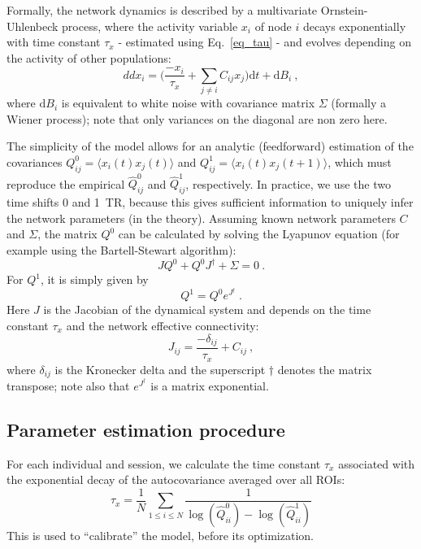\documentclass{article}
\newcommand{\dd}{\mathrm{d}}
\newcommand{\transp}{\dag}
\begin{document}
Formally, the network dynamics is described by a multivariate Ornstein-Uhlenbeck process, where the activity variable $x_i$ of node $i$ decays exponentially with time constant $\tau_x$ - estimated using Eq.~\eqref{eq_tau} - and evolves depending on the activity of other populations:
\begin{equation} \label{eq_dyn_sys}
dd x_i = \big( \frac{- x_i}{\tau_x} + \sum_{j \neq i} C_{ij} x_j \big) \dd t + \dd B_i
\ ,
\end{equation}
where $\dd B_i$ is equivalent to white noise with covariance matrix $\Sigma$ (formally a Wiener process); note that only variances on the diagonal are non zero here.

The simplicity of the model allows for an analytic (feedforward) estimation of the covariances $Q^0_{ij} = \langle x_i(t) x_j(t) \rangle$ and $Q^1_{ij} = \langle x_i(t) x_j(t+1) \rangle$, which must reproduce the empirical $\widehat{Q}^0_{ij}$ and $\widehat{Q}^1_{ij}$, respectively.
In practice, we use the two time shifts 0 and 1~TR, because this gives sufficient information to uniquely infer the network parameters (in the theory).
Assuming known network parameters $C$ and $\Sigma$, the matrix $Q^0$ can be calculated by solving the Lyapunov equation (for example using the Bartell-Stewart algorithm): 
\begin{equation}
J Q^0 + Q^0 J^\transp + \Sigma = 0
\ .
\end{equation}
For $Q^1$, it is simply given by
\begin{equation}
Q^1 = Q^0 e^{J^\transp}
\ .
\end{equation}
Here $J$ is the Jacobian of the dynamical system and depends on the time constant $\tau_x$ and the network effective connectivity: 
\begin{equation} \label{eq_Jac}
J_{ij} = \frac{-\delta_{ij}}{\tau_x} + C_{ij}
\ ,
\end{equation}
where $\delta_{ij}$ is the Kronecker delta and the superscript $\transp$ denotes the matrix transpose; note also that $e^{J^\transp}$ is a matrix exponential. 

\subsection{Parameter estimation procedure}

For each individual and session, we calculate the time constant $\tau_x$ associated with the exponential decay of the autocovariance averaged over all ROIs:
\begin{equation} \label{eq_tau}
\tau_x = \frac{1}{N} \sum_{1 \leq i \leq N} \frac{1}{\log(\widehat{Q}^0_{ii}) - \log(\widehat{Q}^1_{ii})}
\end{equation}
This is used to ``calibrate'' the model, before its optimization. 
\end{document}
